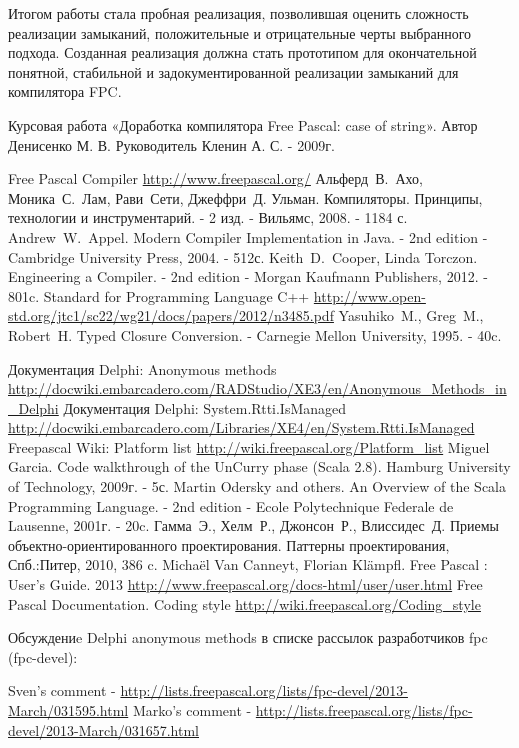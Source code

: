\documentclass{imcs}
\begin{document}
Итогом работы стала пробная реализация, позволившая оценить сложность реализации 
замыканий, положительные и отрицательные черты выбранного подхода.
Созданная реализация должна
стать прототипом для окончательной понятной, стабильной и задокументированной
реализации замыканий для компилятора FPC.

\pagebreak

\begin{thebibliography}{99}
 Курсовая работа «Доработка компилятора Free Pascal: case of string». Автор Денисенко М. В. Руководитель Кленин А. С. - 2009г.
  
 Free Pascal Compiler \url{http://www.freepascal.org/}
 Альферд~В.~Ахо, Моника~С.~Лам, Рави~Сети, Джеффри~Д. Ульман. Компиляторы. Принципы, технологии и инструментарий. - 2 изд. - Вильямс, 2008. - 1184 с.
 Andrew~W.~Appel. Modern Compiler Implementation in Java. - 2nd edition - Cambridge University Press, 2004. - 512с.
 Keith~D.~Cooper, Linda Torczon. Engineering a Compiler. - 2nd edition - Morgan Kaufmann Publishers, 2012. - 801c.
 Standard for Programming Language C++ \url{http://www.open-std.org/jtc1/sc22/wg21/docs/papers/2012/n3485.pdf}
 Yasuhiko~M., Greg~M., Robert~H. Typed  Closure Conversion. - Carnegie Mellon University, 1995. - 40c.
  
 Документация Delphi: Anonymous methods \url{http://docwiki.embarcadero.com/RADStudio/XE3/en/Anonymous_Methods_in_Delphi}
 Документация Delphi: System.Rtti.IsManaged \url{http://docwiki.embarcadero.com/Libraries/XE4/en/System.Rtti.IsManaged}
 Freepascal Wiki: Platform list \url{http://wiki.freepascal.org/Platform_list}
 Miguel Garcia. Code walkthrough of the UnCurry phase (Scala 2.8). Hamburg University of Technology, 2009г. - 5с.
 Martin Odersky and others. An Overview of the Scala Programming Language. - 2nd edition - Ecole Polytechnique Federale de Lausenne, 2001г. - 20c.
 Гамма~Э., Хелм~Р., Джонсон~Р., Влиссидес~Д. Приемы объектно-ориентированного проектирования. Паттерны проектирования, Спб.:Питер, 2010, 386 c.
 Michaël Van Canneyt, Florian Klämpfl. Free Pascal : User’s Guide. 2013 \url{http://www.freepascal.org/docs-html/user/user.html}
 Free Pascal Documentation. Coding style \url{http://wiki.freepascal.org/Coding_style}
  
Обсуждениe Delphi anonymous methods в списке рассылок разработчиков fpc (fpc-devel):

 Sven's comment - \url{http://lists.freepascal.org/lists/fpc-devel/2013-March/031595.html}
 Marko's comment - \url{http://lists.freepascal.org/lists/fpc-devel/2013-March/031657.html}
  
\end{thebibliography}
\end{document}
